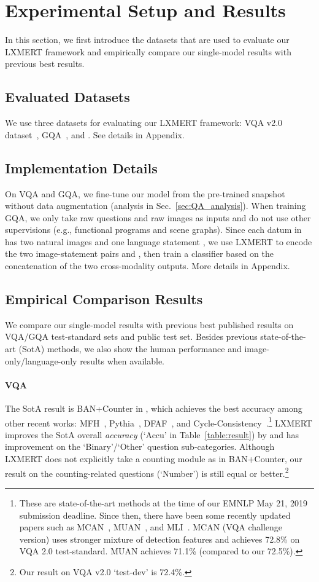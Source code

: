 \documentclass[11pt,a4paper]{article}
\begin{document}
 \section{Experimental Setup and Results}
In this section, we first introduce the datasets that are used to evaluate our LXMERT framework and empirically compare our single-model results with previous best results.
\subsection{Evaluated Datasets}
\label{sec:datasets}
We use three datasets for evaluating our LXMERT framework: VQA v2.0 dataset~\cite{goyal2017making}, GQA~\cite{hudson2019gqa}, and . See details in Appendix.

\subsection{Implementation Details}
\label{sec:implementation}
On VQA and GQA, we fine-tune our model from the pre-trained snapshot without data augmentation (analysis in Sec.~\ref{sec:QA_analysis}).
When training GQA, we only take raw questions and raw images as inputs and do not use other supervisions (e.g., functional programs and scene graphs).
Since each datum in  has two natural images  and one language statement , we use LXMERT to encode the two image-statement pairs  and , then train a classifier based on the concatenation of the two cross-modality outputs.
More details in Appendix.
\subsection{Empirical Comparison Results}
\label{sec:results}
We compare our single-model results with previous best published results on VQA/GQA test-standard sets and  public test set.
Besides previous state-of-the-art (SotA) methods, we also show the human performance and image-only/language-only results when available.
\paragraph{VQA}
The SotA result is BAN+Counter in , which achieves the best accuracy among other recent works: MFH~\cite{yu2018beyond}, Pythia~\cite{jiang2018pythia}, DFAF~\cite{Gao_2019_CVPR}, and Cycle-Consistency~\cite{shah2019cycle}.\footnote{
These are state-of-the-art methods at the time of our EMNLP May 21, 2019 submission deadline. 
Since then, there have been some recently updated papers such as MCAN~\cite{yu2019deep},  MUAN~\cite{yu2019multimodal}, and MLI~\cite{gao2019multimodality}. MCAN (VQA challenge version) uses stronger mixture of detection features and achieves 72.8\% on VQA 2.0 test-standard. MUAN achieves 71.1\% (compared to our 72.5\%).
}
LXMERT improves the SotA overall \emph{accuracy} (`Accu' in Table~\ref{table:result}) by  and has  improvement on the `Binary'/`Other' question sub-categories.
Although LXMERT does not explicitly take a counting module as in BAN+Counter, our result on the counting-related questions (`Number') is still equal or better.\footnote{Our result on VQA v2.0 `test-dev' is 72.4\%.}
\end{document}
